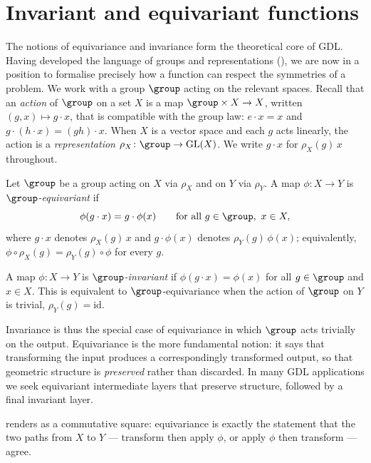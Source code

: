 \section{Invariant and equivariant functions}
\label{sec:priors:inv-equi}

The notions of equivariance and invariance form the theoretical core of GDL.
Having developed the language of groups and representations (),
we are now in a position to formalise precisely how a function can respect the
symmetries of a problem. We work with a group $\group$ acting on the relevant
spaces. Recall that an \emph{action} of $\group$ on a set $X$ is a map
$\group \times X \to X$, written $(g, x) \mapsto g \cdot x$, that is compatible
with the group law: $e \cdot x = x$ and $g \cdot (h \cdot x) = (gh) \cdot x$.
When $X$ is a vector space and each $g$ acts linearly, the action is a
\emph{representation} $\rho_X \colon \group \to \GL(X)$. We write $g \cdot x$
for $\rho_X(g)\, x$ throughout.

\begin{definition}
\label{def:priors:equivariance}
Let $\group$ be a group acting on $X$ via $\rho_X$ and on $Y$ via $\rho_Y$.
A map $\phi \colon X \to Y$ is \emph{$\group$-equivariant} if
\[
  \phi(g \cdot x) = g \cdot \phi(x)
  \qquad \text{for all } g \in \group,\ x \in X,
\]
where $g \cdot x$ denotes $\rho_X(g)\, x$ and $g \cdot \phi(x)$ denotes
$\rho_Y(g)\, \phi(x)$; equivalently, $\phi \circ \rho_X(g) = \rho_Y(g) \circ \phi$
for every $g$.
\end{definition}

\begin{definition}
\label{def:priors:invariance}
A map $\phi \colon X \to Y$ is \emph{$\group$-invariant} if
$\phi(g \cdot x) = \phi(x)$ for all $g \in \group$ and $x \in X$. This is
equivalent to $\group$-equivariance when the action of $\group$ on $Y$ is
trivial, $\rho_Y(g) = \mathrm{id}$.
\end{definition}

Invariance is thus the special case of equivariance in which $\group$ acts
trivially on the output. Equivariance is the more fundamental notion: it says
that transforming the input produces a correspondingly transformed output, so
that geometric structure is \emph{preserved} rather than discarded. In many GDL
applications we seek equivariant intermediate layers that preserve structure,
followed by a final invariant layer.

 renders  as a
commutative square: equivariance is exactly the statement that the two paths
from $X$ to $Y$ --- transform then apply $\phi$, or apply $\phi$ then transform
--- agree.

